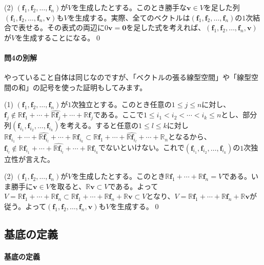 \noindent (2) $(\bm{f}_1, \bm{f}_2, \ldots, \bm{f}_n)$が$V$を生成したとする。このとき勝手な$\bm{v} \in V$を足した列$(\bm{f}_1, \bm{f}_2, \ldots, \bm{f}_n, \bm{v})$も$V$を生成する。実際、全てのベクトルは$(\bm{f}_1, \bm{f}_2, \ldots, \bm{f}_n)$の$1$次結合で表せる。その表式の両辺に$0\bm{v} = \bm{0}$を足した式を考えれば、$(\bm{f}_1, \bm{f}_2, \ldots, \bm{f}_n, \bm{v})$が$V$を生成することになる。\qed

\paragraph{問4の別解} やっていること自体は同じなのですが、「ベクトルの張る線型空間」や「線型空間の和」の記号を使った証明もしてみます。

\noindent (1) $(\bm{f}_1, \bm{f}_2, \ldots, \bm{f}_n)$が$1$次独立とする。このとき任意の$1\leq j \leq n$に対し、$\bm{f}_j \not\in \mathbb{R}\bm{f}_1 + \cdots + \hat{\mathbb{R}\bm{f}_j} + \cdots + \mathbb{R}\bm{f}_j$である。ここで$1\leq i_1 < i_2 < \cdots < i_k \leq n$とし、部分列$(\bm{f}_{i_1}, \bm{f}_{i_2}, \ldots, \bm{f}_{i_k})$を考える。すると任意の$1\leq l \leq k$に対し$\mathbb{R}\bm{f}_{i_1} + \cdots + \hat{\mathbb{R}\bm{f}_{i_l}} + \cdots + \mathbb{R}\bm{f}_{i_k}\subset\mathbb{R}\bm{f}_1 + \cdots + \hat{\mathbb{R}\bm{f}_{i_l}} + \cdots + \mathbb{R}_n$となるから、$\bm{f}_{i_l} \not\in \mathbb{R}\bm{f}_{i_1} + \cdots + \hat{\mathbb{R}\bm{f}_{i_l}} + \cdots + \mathbb{R}\bm{f}_{i_k}$でないといけない。これで$(\bm{f}_{i_1}, \bm{f}_{i_2}, \ldots, \bm{f}_{i_k})$の$1$次独立性が言えた。

\noindent (2) $(\bm{f}_1, \bm{f}_2, \ldots, \bm{f}_n)$が$V$を生成したとする。このとき$\mathbb{R}\bm{f}_1 + \cdots + \mathbb{R}\bm{f}_n = V$である。いま勝手に$\bm{v} \in V$を取ると、$\mathbb{R}\bm{v} \subset V$である。よって$V = \mathbb{R}\bm{f}_1 + \cdots + \mathbb{R}\bm{f}_n \subset \mathbb{R}\bm{f}_1 + \cdots + \mathbb{R}\bm{f}_n + \mathbb{R}\bm{v} \subset V$となり、$V = \mathbb{R}\bm{f}_1 + \cdots + \mathbb{R}\bm{f}_n + \mathbb{R}\bm{v}$が従う。よって$(\bm{f}_1, \bm{f}_2, \ldots, \bm{f}_n, \bm{v})$も$V$を生成する。\qed

\subsection{基底の定義} \label{subsec:basis}

\paragraph{基底の定義}

